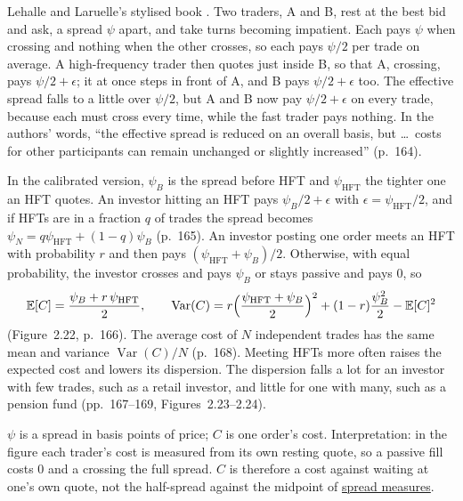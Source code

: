 \begin{qfresult}\label{res:hft-spread-investor-cost}
 Lehalle and Laruelle's stylised book \citep[sec.~2.4.3, pp.~164--165, Figure~2.21]{alpha-laruelle}. Two traders, A and B, rest at the best bid and ask, a spread $\psi$ apart, and take turns becoming impatient. Each pays $\psi$ when crossing and nothing when the other crosses, so each pays $\psi/2$ per trade on average. A high-frequency trader then quotes just inside B, so that A, crossing, pays $\psi/2+\epsilon$; it at once steps in front of A, and B pays $\psi/2+\epsilon$ too. The effective spread falls to a little over $\psi/2$, but A and B now pay $\psi/2+\epsilon$ on every trade, because each must cross every time, while the fast trader pays nothing. In the authors' words, ``the effective spread is reduced on an overall basis, but \dots\ costs for other participants can remain unchanged or slightly increased'' (p.~164).

In the calibrated version, $\psi_B$ is the spread before HFT and $\psi_{\mathrm{HFT}}$ the tighter one an HFT quotes. An investor hitting an HFT pays $\psi_B/2+\epsilon$ with $\epsilon=\psi_{\mathrm{HFT}}/2$, and if HFTs are in a fraction $q$ of trades the spread becomes $\psi_N=q\psi_{\mathrm{HFT}}+(1-q)\psi_B$ (p.~165). An investor posting one order meets an HFT with probability $r$ and then pays $(\psi_{\mathrm{HFT}}+\psi_B)/2$. Otherwise, with equal probability, the investor crosses and pays $\psi_B$ or stays passive and pays 0, so
\[ \mathbb E[C]=\frac{\psi_B+r\,\psi_{\mathrm{HFT}}}{2},\qquad \operatorname{Var}(C)=r\Bigl(\frac{\psi_{\mathrm{HFT}}+\psi_B}{2}\Bigr)^2+(1-r)\frac{\psi_B^2}{2}-\mathbb E[C]^2 \]
(Figure~2.22, p.~166). The average cost of $N$ independent trades has the same mean and variance $\operatorname{Var}(C)/N$ (p.~168). Meeting HFTs more often raises the expected cost and lowers its dispersion. The dispersion falls a lot for an investor with few trades, such as a retail investor, and little for one with many, such as a pension fund (pp.~167--169, Figures~2.23--2.24).

 $\psi$ is a spread in basis points of price; $C$ is one order's cost. Interpretation: in the figure each trader's cost is measured from its own resting quote, so a passive fill costs 0 and a crossing the full spread. $C$ is therefore a cost against waiting at one's own quote, not the half-spread against the midpoint of \hyperref[def:spread-measures]{spread measures}.


\end{qfresult}
